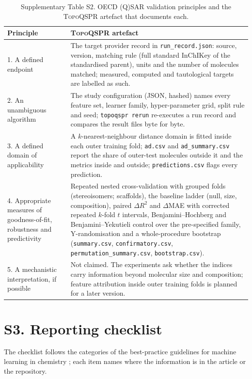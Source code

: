 \documentclass[preprint,12pt]{elsarticle}
\newcommand{\ml}{\textsc{TopoQSPR}}
\begin{document}
\begin{table}[h]
\centering\footnotesize
\caption{Supplementary Table S2. OECD (Q)SAR validation principles and the \ml{} artefact that documents each.}
\begin{tabular}{p{3.6cm}p{9.4cm}}
\toprule
Principle & \ml{} artefact \\
\midrule
1. A defined endpoint & The target provider record in \texttt{run\_record.json}: source, version, matching rule (full standard InChIKey of the standardised parent), units and the number of molecules matched; measured, computed and tautological targets are labelled as such. \\
2. An unambiguous algorithm & The study configuration (JSON, hashed) names every feature set, learner family, hyper-parameter grid, split rule and seed; \texttt{topoqspr rerun} re-executes a run record and compares the result files byte for byte. \\
3. A defined domain of applicability & A $k$-nearest-neighbour distance domain is fitted inside each outer training fold; \texttt{ad.csv} and \texttt{ad\_summary.csv} report the share of outer-test molecules outside it and the metrics inside and outside; \texttt{predictions.csv} flags every prediction. \\
4. Appropriate measures of goodness-of-fit, robustness and predictivity & Repeated nested cross-validation with grouped folds (stereoisomers; scaffolds), the baseline ladder (null, size, composition), paired $\Delta R^2$ and $\Delta$MAE with corrected repeated $k$-fold $t$ intervals, Benjamini--Hochberg and Benjamini--Yekutieli control over the pre-specified family, Y-randomisation and a whole-procedure bootstrap (\texttt{summary.csv}, \texttt{confirmatory.csv}, \texttt{permutation\_summary.csv}, \texttt{bootstrap.csv}). \\
5. A mechanistic interpretation, if possible & Not claimed. The experiments ask whether the indices carry information beyond molecular size and composition; feature attribution inside outer training folds is planned for a later version. \\
\bottomrule
\end{tabular}
\end{table}

\section*{S3. Reporting checklist}
The checklist follows the categories of the best-practice guidelines for machine learning in chemistry \cite{artrith2021best}; each item names where the information is in the article or the repository.
\end{document}
